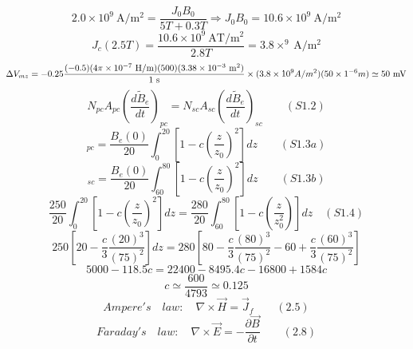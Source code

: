 \begin{equation}%
2.0\times 10^{9}\ \mathrm{A/m^{2}}=\frac{J_{0}B_{0}}{5T+0.3T}\Rightarrow J_{0}B_{0}=10.6\times10^{9}\ \mathrm{A/m^{2}}
\end{equation}
\begin{equation}%
J_{c}(2.5T)=\frac{10.6\times10^{9}\ \mathrm{AT/m^{2}}}{2.8T}=3.8\times^{9}\ \mathrm{A/m^{2}}
\end{equation}
\begin{equation}%
\Delta V_{mz}=-0.25\frac{(-0.5)(4\pi\times10^{-7}\ \mathrm{H/m})(500)(3.38\times10^{-3}\ \mathrm{m^{2}})}{1\ \mathrm{s}}\\
\times(3.8\times10^{9}A/m^{2})(50\times1^{-6}m)
\simeq 50\ \mathrm{mV}
\end{equation}
\begin{equation}%
N_{pc}A_{pc}(\frac{d\tilde{B}_{e}}{dt})_{pc}=N_{sc}A_{sc}(\frac{d\tilde{B}_{e}}{dt})_{sc}\qquad(S1.2)
\end{equation}
\begin{equation}%
[\tilde{B}_{e}]_{pc}=\frac{B_{e}(0)}{20}\int_{0}^{20}[1-c(\frac{z}{z_{0}})^{2}]dz\qquad(S1.3a)
\end{equation}
\begin{equation}%
[\tilde{B}_{e}]_{sc}=\frac{B_{e}(0)}{20}\int_{60}^{80}[1-c(\frac{z}{z_{0}})^{2}]dz\qquad(S1.3b)
\end{equation}
\begin{equation}%
\frac{250}{20}\int_{0}^{20}[1-c(\frac{z}{z_{0}})^{2}]dz=\frac{280}{20}\int_{60}^{80}[1-c(\frac{z}{z_{0}^{2}})]dz\quad(S1.4)
\end{equation}
\begin{equation}%
250[20-\frac{c}{3}\frac{(20)^{3}}{(75)^{2}}]dz=280[80-\frac{c}{3}\frac{(80)^{3}}{(75)^{2}}-60+\frac{c}{3}\frac{(60)^{3}}{(75)^{2}}]
\end{equation}
\begin{equation}%
5000-118.5c=22400-8495.4c-16800+1584c
\end{equation}
\begin{equation}%
c\simeq\frac{600}{4793}\simeq0.125
\end{equation}
\begin{equation}%
Ampere's\quad law:\quad \nabla\times\vec{H}=\vec{J}_{f}\qquad(2.5)
\end{equation}
\begin{equation}%
Faraday's\quad law:\quad\nabla\times\vec{E}=-\frac{\partial\vec{B}}{\partial t}\qquad(2.8)
\end{equation}
